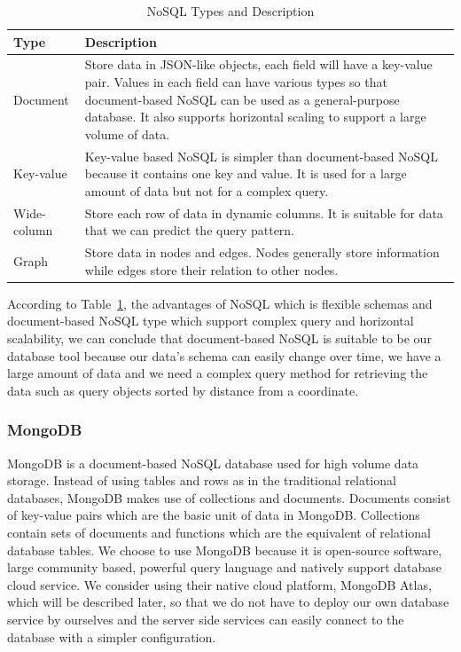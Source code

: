 \documentclass[12pt,oneside,openright,a4paper]{cpe-english-project}
\begin{document}
\begin{table}[H]
\caption{NoSQL Types and Description}\label{tbl:2NoSQLTypesandDescription}
\begin{tabularx}{\textwidth}{l|X} \hline\hline
Type & Description \\ \hline\hline
Document & Store data in JSON-like objects, each field will have a key-value pair. Values in each field can have various types so that document-based NoSQL can be used as a general-purpose database. It also supports horizontal scaling to support a large volume of data. \\ \hline
Key-value & Key-value based NoSQL is simpler than document-based NoSQL because it contains one key and value. It is used for a large amount of data but not for a complex query. \\ \hline
Wide-column & Store each row of data in dynamic columns. It is suitable for data that we can predict the query pattern. \\ \hline
Graph & Store data in nodes and edges. Nodes generally store information while edges store their relation to other nodes. \\ \hline\hline
\end{tabularx}
\end{table}

According to Table~\ref{tbl:2NoSQLTypesandDescription}, the advantages of NoSQL which is flexible schemas and document-based NoSQL type which support complex query and horizontal scalability, we can conclude that document-based NoSQL is suitable to be our database tool because our data’s schema can easily change over time, we have a large amount of data and we need a complex query method for retrieving the data such as query objects sorted by distance from a coordinate.

\subsubsection{MongoDB}

MongoDB is a document-based NoSQL database used for high volume data storage. Instead of using tables and rows as in the traditional relational databases, MongoDB makes use of collections and documents. Documents consist of key-value pairs which are the basic unit of data in MongoDB. Collections contain sets of documents and functions which are the equivalent of relational database tables. \cite{WhatisMongoDBIntroductionArchitectureFeaturesExample} We choose to use MongoDB because it is open-source software, large community based, powerful query language and natively support database cloud service. We consider using their native cloud platform, MongoDB Atlas, which will be described later, so that we do not have to deploy our own database service by ourselves and the server side services can easily connect to the database with a simpler configuration.
\end{document}
